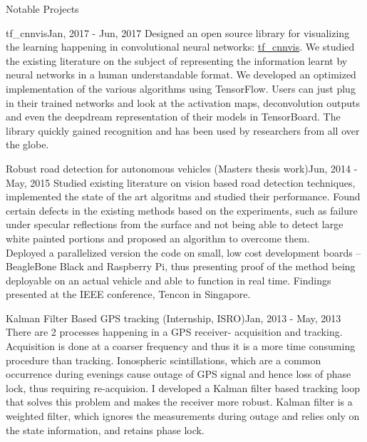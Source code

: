\documentclass{resume} %
\begin{document}
	\begin{rSection}{Notable Projects}
		
	\begin{rSubsection}{tf\_cnnvis}{Jan, 2017 - Jun, 2017}{}{}{}
		Designed an open source library for visualizing the learning happening in convolutional neural networks: \href{https://github.com/InFoCusp/tf_cnnvis}{tf\_cnnvis}. We studied the existing literature on the subject of representing the information learnt by neural networks in a human understandable format. We developed an optimized implementation of the various algorithms using TensorFlow. Users can just plug in their trained networks and look at the activation maps, deconvolution outputs and even the deepdream representation of their models in TensorBoard. The library quickly gained recognition and has been used by researchers from all over the globe. 
	\end{rSubsection}
		\vspace{0.1 in}
	\begin{rSubsection}{Robust road detection for autonomous vehicles (Masters thesis work)}{Jun, 2014 - May, 2015}{}{}	{}
		Studied existing literature on vision based road detection techniques, implemented the state of the art algoritms and studied their performance. Found certain defects in the existing methods based on the experiments, such as failure under specular reflections from the surface and not being able to detect large white painted portions and proposed an algorithm to overcome them. \\
		Deployed a parallelized version the code on small, low cost development boards – BeagleBone Black and Raspberry Pi, thus presenting proof of the method being deployable on an actual vehicle and able to function in real time. Findings presented at the IEEE conference, Tencon in Singapore. 
	\end{rSubsection}
		\vspace{0.1 in}
	\begin{rSubsection}{Kalman Filter Based GPS tracking  (Internship, ISRO)}{Jan, 2013 - May, 2013}{}{}	{}
		There are 2 processes happening in a GPS receiver- acquisition and tracking. Acquisition is done at a coarser frequency and thus it is a more time consuming procedure than tracking. Ionospheric scintillations, which are a common occurrence during evenings cause outage of GPS signal and hence loss of phase lock, thus requiring re-acquision. I developed a Kalman filter based tracking loop that solves this problem and makes the receiver more robust. Kalman filter is a weighted filter, which ignores the measurements during outage and relies only on the state information, and retains phase lock. 
	\end{rSubsection}
	\vspace{0.1 in}
	

\end{rSection}
\end{document}
